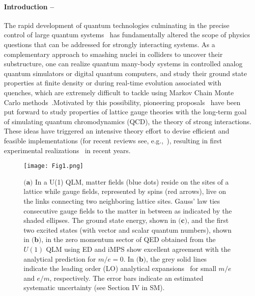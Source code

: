 \documentclass[aps,prl,reprint,twocolumn,superscriptaddress,floatfix,nofootinbib]{revtex4-1}
\begin{document}
	\paragraph{Introduction --}
	The rapid development of quantum technologies culminating in the precise control of large quantum systems~\cite{BlochDalibard2012, BlattRoos2012,georgescu2014quantum,Hauke_2012} has fundamentally altered the scope of physics questions that can be addressed for strongly interacting systems. As a complementary approach to smashing nuclei in colliders to uncover their substructure, one can realize quantum many-body systems in controlled analog quantum simulators or digital quantum computers, and study their ground state properties at finite density or during real-time evolution associated with quenches, which are extremely difficult to tackle using Markov Chain Monte Carlo methods~\cite{Hofstetter_2018, Wiese_2014}.Motivated by this possibility, pioneering proposals~\cite{zohar2011confinement,Zohar:2012ay,Tagliacozzo:2012vg,Banerjee2012pg} have been put forward to study properties of lattice gauge theories with the long-term goal of simulating quantum chromodynamics (QCD), the theory of strong interactions. These ideas have triggered an intensive theory effort to devise efficient and feasible implementations (for recent reviews see, e.g.,~\cite{Zohar_2015, Dalmonte2016, banuls2020simulating}), resulting in first experimental realizations~\cite{martinez2016real, klco2018quantum, schweizer2019floquet, gorg2019realization, mil2020scalable,yang2020observation,atas20212, Lu_2019} in recent years.
	\begin{figure}[h]
		\centering
		\texttt{[image: Fig1.png]}
		\caption{$\textbf{(a)}$ In a U(1) QLM, matter fields (blue dots) reside on the sites of a lattice while gauge fields, represented by spins (red arrows), live on the links connecting two neighboring lattice sites. Gauss' law ties consecutive gauge fields to the matter in between as indicated by the shaded ellipses.
			The ground state energy, shown in $\textbf{(c)}$, and the first two excited states (with vector and scalar quantum numbers), shown in $\textbf{(b)}$, in the zero momentum sector of QED obtained from the $U(1)$ QLM using ED and iMPS show excellent agreement with the analytical prediction for $m/e=0$. In $\textbf{(b)}$, the grey solid lines indicate the leading order (LO) analytical expansions~\cite{sriganesh2000new} for small $m/e$ and $e/m$, respectively. The error bars indicate an estimated systematic uncertainty (see Section IV in SM).}
		\label{fig:illustration}
	\end{figure}
	
\end{document}
